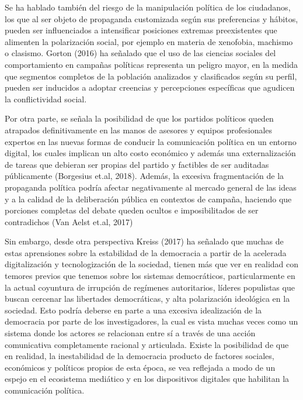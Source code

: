 \documentclass[
  10pt,
  letterpaper,
]{report}
\begin{document}
Se ha hablado también del riesgo de la manipulación política de los
ciudadanos, los que al ser objeto de propaganda customizada según sus
preferencias y hábitos, pueden ser influenciados a intensificar
posiciones extremas preexistentes que alimenten la polarización social,
por ejemplo en materia de xenofobia, machismo o clasismo. Gorton (2016)
ha señalado que el uso de las ciencias sociales del comportamiento en
campañas políticas representa un peligro mayor, en la medida que
segmentos completos de la población analizados y clasificados según su
perfil, pueden ser inducidos a adoptar creencias y percepciones
específicas que agudicen la conflictividad social.

Por otra parte, se señala la posibilidad de que los partidos políticos
queden atrapados definitivamente en las manos de asesores y equipos
profesionales expertos en las nuevas formas de conducir la comunicación
política en un entorno digital, los cuales implican un alto costo
económico y además una externalización de tareas que debieran ser
propias del partido y factibles de ser auditadas públicamente (Borgesius
et.al, 2018). Además, la excesiva fragmentación de la propaganda
política podría afectar negativamente al mercado general de las ideas y
a la calidad de la deliberación pública en contextos de campaña,
haciendo que porciones completas del debate queden ocultos e
imposibilitados de ser contradichos (Van Aelst et.al, 2017)

Sin embargo, desde otra perspectiva Kreiss (2017) ha señalado que muchas
de estas aprensiones sobre la estabilidad de la democracia a partir de
la acelerada digitalización y tecnologización de la sociedad, tienen más
que ver en realidad con temores previos que tenemos sobre los sistemas
democráticos, particularmente en la actual coyuntura de irrupción de
regímenes autoritarios, líderes populistas que buscan cercenar las
libertades democráticas, y alta polarización ideológica en la sociedad.
Esto podría deberse en parte a una excesiva idealización de la
democracia por parte de los investigadores, la cual es vista muchas
veces como un sistema donde los actores se relacionan entre sí a través
de una acción comunicativa completamente racional y articulada. Existe
la posibilidad de que en realidad, la inestabilidad de la democracia
producto de factores sociales, económicos y políticos propios de esta
época, se vea reflejada a modo de un espejo en el ecosistema mediático y
en los dispositivos digitales que habilitan la comunicación política.

\newpage
\end{document}
